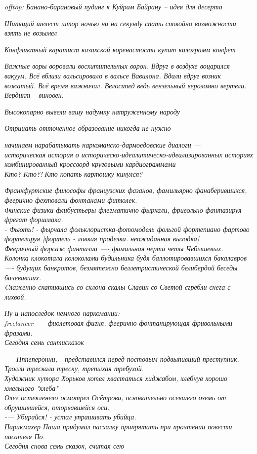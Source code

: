 \begin{flushleft}
    \emph{offtop: Банано-барановый пудинг к Куйрам Байрану -- идея для десерта}

    \emph{Шипящий шелест штор ночью ни на секунду спать спокойно возможности взять не возымел}

    \emph{Конфликтный каратист казахской коренастости купит килограмм конфет}

    \emph{Важные воры воровали восхитительных ворон. Вдруг в воздухе воцарился вакуум.
    Всё вблизи вальсировало в вальсе Вавилона. Вдали вдруг возник вожатый. Всё время важничал.
    Велосипед ведь вензельный вероломно вертели.\\
    Вердикт -- виновен.}

    \emph{Высокопарно вывели вашу надумку натруженному народу}

    \emph{Отрицать отточенное образование никогда не нужно}

    \emph{начинаем нарабатывать наркоманско-дармоедовские диалоги ---\\
    историческая история о историческо-идеалитическо-идеализированных историях\\
    комбинированный кроссворд круговыми кардиограммами\\
    Кто? Кто?! Кто копать картошку кинулся?}

    \emph{Франкфуртские философы французских фазанов, фамильярно фанаберившихся, феерично фехтовали фонтанами фитюлек.\\
    Финские физики-флибустьеры флегматично фыркали, фривольно фантазируя фрегат форшмака.\\
    - Фьють! - фырчала фольклористка-фотомодель фольгой фортепиано фартово фортелируя 
        [фортель - ловкая проделка. неожиданная выходка]\\
    Фееричный форсаж фантазии —- фамильная черта четы Чебышевых.\\
    Колонка клокотала колоколами будильника будя баллотировавшихся бакалавров —- будущих банкротов, безмятежно беллетристической белибердой беседы бичевавших.\\
    Cлаженно скатившись со склона скалы Славик со Светой сгребли снега с лихвой.}

    \emph{Ну и напоследок немного наркомании:\\
    freelancer —- фиолетовая фигня, феерично фонтанирующая фривольными фразами.\\
    Сегодня семь сантисказок}

    \emph{-— Пппеперонни, - представился перед постовым подвыпивший преступник.\\
    Тролли трескали треску, трепыхая требухой.\\
    Художник хутора Хорьков хотел хвастаться хиджабом, хлебнув хорошо хмельного "хлеба"\\
    Олег остекленело осмотрел Осётрова, основательно осевшего оземь от обрушившейся, оторвавшейся оси.\\
    -— Убирайся! - устал упрашивать убийца.\\
    Парикмахер Паша придумал пасхалку припрятать при прочтении повести писателя По.\\
    Сегодня снова семь сказок, считая сею}


\end{flushleft}
